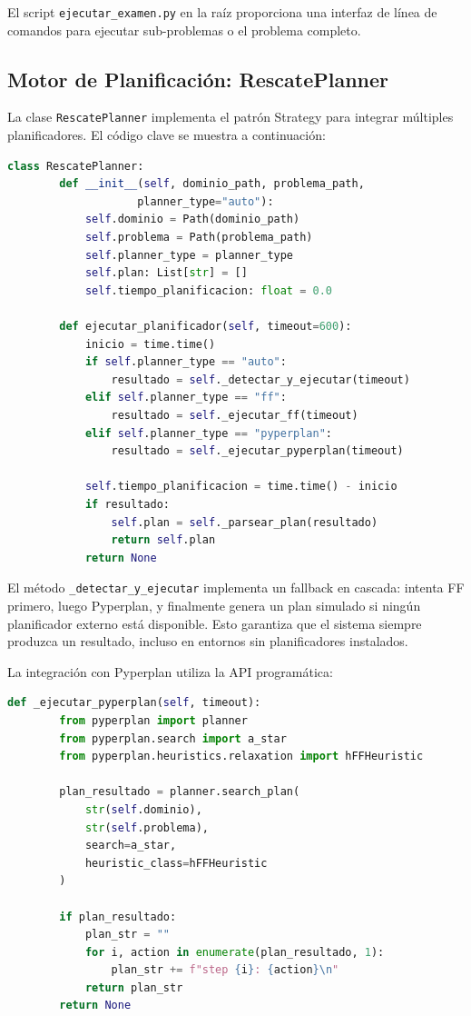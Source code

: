 \documentclass[conference]{IEEEtran}
\begin{document}
    El script \texttt{ejecutar\_examen.py} en la raíz proporciona una interfaz de línea de comandos para ejecutar sub-problemas o el problema completo.

    \subsection{Motor de Planificación: RescatePlanner}

    La clase \texttt{RescatePlanner} implementa el patrón Strategy para integrar múltiples planificadores. El código clave se muestra a continuación:

    \begin{lstlisting}[language=Python]
    class RescatePlanner:
        def __init__(self, dominio_path, problema_path, 
                    planner_type="auto"):
            self.dominio = Path(dominio_path)
            self.problema = Path(problema_path)
            self.planner_type = planner_type
            self.plan: List[str] = []
            self.tiempo_planificacion: float = 0.0
        
        def ejecutar_planificador(self, timeout=600):
            inicio = time.time()
            if self.planner_type == "auto":
                resultado = self._detectar_y_ejecutar(timeout)
            elif self.planner_type == "ff":
                resultado = self._ejecutar_ff(timeout)
            elif self.planner_type == "pyperplan":
                resultado = self._ejecutar_pyperplan(timeout)
            
            self.tiempo_planificacion = time.time() - inicio
            if resultado:
                self.plan = self._parsear_plan(resultado)
                return self.plan
            return None
    \end{lstlisting}

    El método \texttt{\_detectar\_y\_ejecutar} implementa un fallback en cascada: intenta FF primero, luego Pyperplan, y finalmente genera un plan simulado si ningún planificador externo está disponible. Esto garantiza que el sistema siempre produzca un resultado, incluso en entornos sin planificadores instalados.

    La integración con Pyperplan utiliza la API programática:

    \begin{lstlisting}[language=Python]
    def _ejecutar_pyperplan(self, timeout):
        from pyperplan import planner
        from pyperplan.search import a_star
        from pyperplan.heuristics.relaxation import hFFHeuristic
        
        plan_resultado = planner.search_plan(
            str(self.dominio),
            str(self.problema),
            search=a_star,
            heuristic_class=hFFHeuristic
        )
        
        if plan_resultado:
            plan_str = ""
            for i, action in enumerate(plan_resultado, 1):
                plan_str += f"step {i}: {action}\n"
            return plan_str
        return None
    \end{lstlisting}
\end{document}
